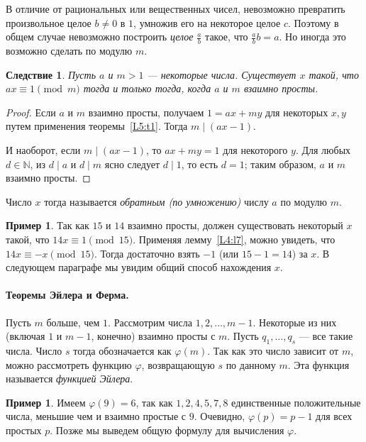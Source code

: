\documentclass[12pt,notitlepage]{article}
\theoremstyle{plain}
\newtheorem{corr}[thm]{Следствие}
\theoremstyle{definition}
\newtheorem{exm}[thm]{Пример}
\theoremstyle{plain}
\newcommand{\N}{\mathbb{N}}
\renewcommand{\phi}{\varphi}
\newcommand{\1}{\mathbf{1}}
\newcommand{\0}{\mathbf{0}}
\newcommand{\dvd}{\mathop{\mid}}
\begin{document}
В отличие от рациональных или вещественных чисел, невозможно превратить произвольное целое $b \neq 0$ в $1$, умножив его на некоторое целое $c$. Поэтому в общем случае невозможно построить \emph{целое} $\frac{a}{b}$ такое, что $\frac{a}{b} b = a$. Но иногда это возможно сделать по модулю $m$.
\begin{corr}\label{L5:c2}
	Пусть $a$ и $m > 1$ --- некоторые числа. Существует $x$ такой, что $a x \equiv 1 \pmod m$ тогда и только тогда, когда $a$ и $m$ взаимно просты.
\end{corr}
\begin{proof}
	Если $a$ и $m$ взаимно просты, получаем $1 = a x + m y$ для некоторых $x, y$ путем применения теоремы~\ref{L5:t1}. Тогда $m \dvd (a x - 1)$.
	
	И наоборот, если $m \dvd (a x - 1)$, то $ax + m y = 1$ для некоторого $y$. Для любых $d \in \N$, из $d \dvd a$ и $d \dvd m$ ясно следует $d \dvd 1$, то есть $d = 1$; таким образом, $a$ и $m$ взаимно просты.
\end{proof}
\noindent Число $x$ тогда называется \emph{обратным (по умножению)} числу $a$ по модулю $m$.
\begin{exm}
	Так как $15$ и $14$ взаимно просты, должен существовать некоторый $x$ такой, что $14 x \equiv 1 \pmod {15}$. Применяя лемму~\ref{L4:l7}, можно увидеть, что $14 x \equiv -x \pmod {15}$. Тогда достаточно взять $-1$ (или $15 - 1 = 14$) за $x$. В следующем параграфе мы увидим общий способ нахождения $x$.
\end{exm}


\paragraph{Теоремы Эйлера и Ферма.} Пусть $m$ больше, чем $1$. Рассмотрим числа $1, 2, \ldots, m - 1$. Некоторые из них (включая $1$ и $m-1$, конечно) взаимно просты с $m$. Пусть $q_1, \ldots, q_s$ --- все такие числа. Число $s$ тогда обозначается как $\phi(m)$. Так как это число зависит от $m$, можно рассмотреть функцию $\phi$, возвращающую $s$ по данному $m$. Эта функция называется \emph{функцией Эйлера}.

\begin{exm}
	Имеем $\phi(9) = 6$, так как $1, 2, 4, 5, 7, 8$ единственные положительные числа, меньшие чем и взаимно простые с $9$. Очевидно, $\phi(p) = p - 1$ для всех простых $p$. Позже мы выведем общую формулу для вычисления $\phi$.
\end{exm}
\end{document}
